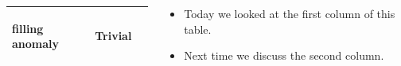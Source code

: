 \documentclass{beamer}
\renewcommand{\(}{\left(}
\renewcommand{\)}{\right)}
\renewcommand{\[}{\left[}
\renewcommand{\]}{\right]}
\begin{document}
\begin{frame}
\begin{columns}
\begin{column}{0.5\textwidth}
\begin{table}
\begin{adjustbox}{width=\columnwidth,center}
\begin{tabular}{|| p{2.5cm}| p{2.5cm} | p{2.5cm}||}
\begin{center}
                        filling anomaly
                        \end{center}
                        & 
                        \begin{center}
                        Trivial
                        \end{center}
                            \\ 
                        \hline
                        \end{tabular}
                \end{adjustbox}
            \end{table}
        \end{column}
        \begin{column}{0.5\textwidth}
            \begin{itemize}
                \item Today we looked at the first column of this table. 
                \item Next time we discuss the second column. 
            \end{itemize}
        \end{column}
    \end{columns}

\end{frame}
\end{document}
